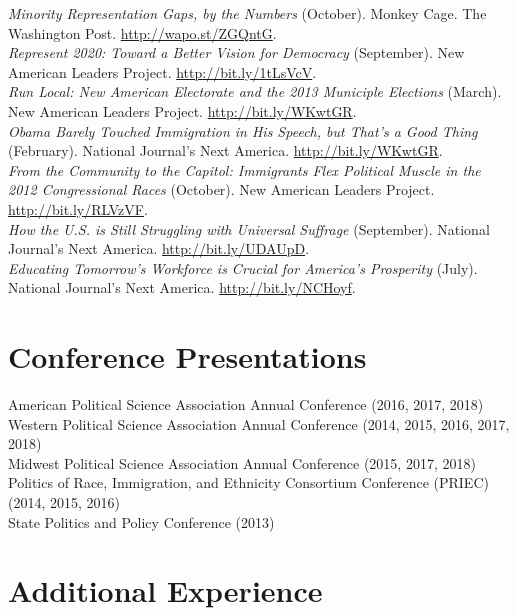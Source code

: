 \documentclass[11pt, a4paper]{article}
\newcommand{\years}[1]{\marginnote{\scriptsize #1}}
\begin{document}
\years{2014}\textit{Minority Representation Gaps, by the Numbers} (October). Monkey Cage. The Washington Post. \href{http://wapo.st/ZGQntG}{http://wapo.st/ZGQntG}.\\
\years{}\textit{Represent 2020: Toward a Better Vision for Democracy} (September). New American Leaders Project. \href{http://bit.ly/1tLsVcV}{http://bit.ly/1tLsVcV}.\\
\years{2013}\textit{Run Local: New American Electorate and the 2013 Municiple Elections} (March). New American Leaders Project. \href{http://bit.ly/WKwtGR}{http://bit.ly/WKwtGR}.\\
\years{}\textit{Obama Barely Touched Immigration in His Speech, but That's a Good Thing} (February). National Journal's Next America. \href{http://bit.ly/12R7lVG}{http://bit.ly/WKwtGR}.\\
\years{2012}\textit{From the Community to the Capitol: Immigrants Flex Political Muscle in the 2012 Congressional Races} (October). New American Leaders Project. \href{http://bit.ly/RLVzVF}{http://bit.ly/RLVzVF}.\\
\years{}\textit{How the U.S. is Still Struggling with Universal Suffrage} (September). National Journal's Next America.  \href{http://bit.ly/UDAUpD}{http://bit.ly/UDAUpD}.\\
\years{}\textit{Educating Tomorrow's Workforce is Crucial for America's Prosperity} (July). National Journal's Next America. \href{http://bit.ly/NCHoyf}{http://bit.ly/NCHoyf}.\\

\section*{Conference Presentations}

\years{}American Political Science Association Annual Conference (2016, 2017, 2018)\\
\years{}Western Political Science Association Annual Conference (2014, 2015, 2016, 2017, 2018)\\
\years{}Midwest Political Science Association Annual Conference (2015, 2017, 2018)\\
\years{}Politics of Race, Immigration, and Ethnicity Consortium Conference (PRIEC) (2014, 2015, 2016)\\
\years{}State Politics and Policy Conference (2013)

\section*{Additional Experience}
\end{document}
